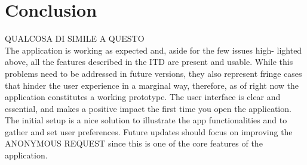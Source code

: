 \section{Conclusion}
QUALCOSA DI SIMILE A QUESTO\\
The application is working as expected and, aside for the few issues high-
lighted above, all the features described in the ITD are present and usable.
While this problems need to be addressed in future versions, they also
represent fringe cases that hinder the user experience in a marginal way,
therefore, as of right now the application constitutes a working prototype.
The user interface is clear and essential, and makes a positive impact the
first time you open the application. The initial setup is a nice solution to
illustrate the app functionalities and to gather and set user preferences.
Future updates should focus on improving the ANONYMOUS REQUEST since this is one of the core features of the application.